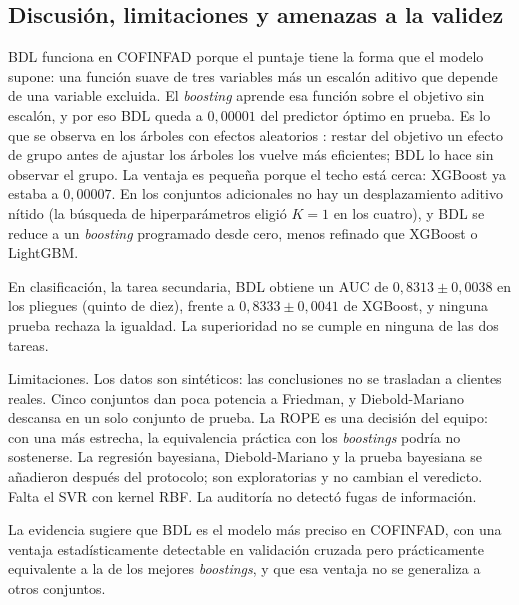 \subsection{Discusión, limitaciones y amenazas a la validez}

BDL funciona en COFINFAD porque el puntaje tiene la forma que el modelo supone: una función suave de tres variables
más un escalón aditivo que depende de una variable excluida. El \emph{boosting} aprende esa función sobre el objetivo
sin escalón, y por eso BDL queda a $0{,}00001$ del predictor óptimo en prueba. Es lo que se observa en los árboles con
efectos aleatorios \citep{hajjem2014,sigrist2022}: restar del objetivo un efecto de grupo antes de ajustar los árboles
los vuelve más eficientes; BDL lo hace sin observar el grupo. La ventaja es pequeña porque el techo está cerca: XGBoost
ya estaba a $0{,}00007$. En los conjuntos adicionales no hay un desplazamiento aditivo nítido (la búsqueda de
hiperparámetros eligió $K=1$ en los cuatro), y BDL se reduce a un \emph{boosting} programado desde cero, menos refinado
que XGBoost o LightGBM.

En clasificación, la tarea secundaria, BDL obtiene un AUC de $0{,}8313 \pm 0{,}0038$ en los pliegues (quinto de diez),
frente a $0{,}8333 \pm 0{,}0041$ de XGBoost, y ninguna prueba rechaza la igualdad. La superioridad no se cumple en
ninguna de las dos tareas.

Limitaciones. Los datos son sintéticos: las conclusiones no se trasladan a clientes reales. Cinco conjuntos
dan poca potencia a Friedman, y Diebold-Mariano descansa en un solo conjunto de prueba. La ROPE es una decisión del
equipo: con una más estrecha, la equivalencia práctica con los \emph{boostings} podría no sostenerse. La regresión
bayesiana, Diebold-Mariano y la prueba bayesiana se añadieron después del protocolo; son exploratorias y no cambian el
veredicto. Falta el SVR con kernel RBF. La auditoría no detectó fugas de
información.

La evidencia sugiere que BDL es el modelo más preciso en COFINFAD, con una ventaja estadísticamente detectable en
validación cruzada pero prácticamente equivalente a la de los mejores \emph{boostings}, y que esa ventaja no se
generaliza a otros conjuntos.
